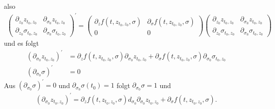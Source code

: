 \begin{solution}
\begin{enumerate}[label = \textbf{\alph*)}]
also
\begin{align*}
\begin{pmatrix}
  \partial_{z_0} z_{t_0,z_0} & \partial_{\sigma_0} z_{t_0,z_0} \\
  \partial_{z_0} \sigma_{t_0,z_0} & \partial_{\sigma_0} \sigma_{t_0,z_0}
\end{pmatrix}^{\prime}
=
\begin{pmatrix}
  \partial_{z} f(t,z_{t_0,z_0}, \sigma) & \partial_{\sigma} f(t,z_{t_0,z_0}, \sigma) \\
  0 & 0
\end{pmatrix}
\begin{pmatrix}
  \partial_{z_0} z_{t_0,z_0} & \partial_{\sigma_0} z_{t_0,z_0} \\
  \partial_{z_0} \sigma_{t_0,z_0} & \partial_{\sigma_0} \sigma_{t_0,z_0}
\end{pmatrix}
\end{align*}
und es folgt
\begin{align*}
  (\partial_{\sigma_0} z_{t_0,z_0})^{\prime} &= \partial_z f(t,z_{t_0,z_0},\sigma) \partial_{\sigma_0} z_{t_0,z_0}
  + \partial_{\sigma} f(t,z_{t_0,z_0},\sigma) \partial_{\sigma_0} \sigma_{t_0,z_0} \\
  (\partial_{\sigma_0} \sigma)^{\prime} &= 0
\end{align*}
Aus $(\partial_{\sigma_0} \sigma)^{\prime} = 0$ und $\partial_{\sigma_0}\sigma(t_0) = 1$
folgt $\partial_{\sigma_0} \sigma = 1$ und
\begin{align*}
  (\partial_{\sigma_0}z_{t_0,z_0})^{\prime} =
  \partial_z f(t,z_{t_0,z_0},\sigma)d_{\sigma_0}\partial_{\sigma_0} z_{t_0,z_0}
  + \partial_\sigma f(t,z_{t_0,z_0},\sigma).
\end{align*}
\end{enumerate}
\end{solution}
